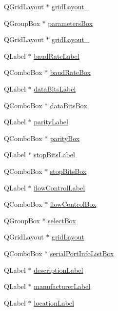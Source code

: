 \begin{DoxyCompactItemize}
\item 
Q\+Grid\+Layout $\ast$ \hyperlink{a00029_a2cc53955b73f22f0cfcf508da4654b16}{grid\+Layout\+\_}
\item 
Q\+Group\+Box $\ast$ \hyperlink{a00029_a47cebbe70a990bd1f309250101022889}{parameters\+Box}
\item 
Q\+Grid\+Layout $\ast$ \hyperlink{a00029_a7b71d6038a34f600625f007630c5234e}{grid\+Layout\+\_}
\item 
Q\+Label $\ast$ \hyperlink{a00029_a57e59712bae4f482b1ff1d61c81471e8}{baud\+Rate\+Label}
\item 
Q\+Combo\+Box $\ast$ \hyperlink{a00029_a766a61db4a8c72219543f7c096ae5601}{baud\+Rate\+Box}
\item 
Q\+Label $\ast$ \hyperlink{a00029_a4d827d5f217aa166e228b0e2c9c5aaf7}{data\+Bits\+Label}
\item 
Q\+Combo\+Box $\ast$ \hyperlink{a00029_ab6082bb196e22af4ca04a04db3402166}{data\+Bits\+Box}
\item 
Q\+Label $\ast$ \hyperlink{a00029_ae062846ca8db471d7eb362ae39123422}{parity\+Label}
\item 
Q\+Combo\+Box $\ast$ \hyperlink{a00029_a88c0b5d1f96a308ab115937b090f7bba}{parity\+Box}
\item 
Q\+Label $\ast$ \hyperlink{a00029_a665748b39dda24475690e2363b72e265}{stop\+Bits\+Label}
\item 
Q\+Combo\+Box $\ast$ \hyperlink{a00029_ad61890c5fd0acc9e72385efd02df90c0}{stop\+Bits\+Box}
\item 
Q\+Label $\ast$ \hyperlink{a00029_a7876a6baf43bd21d3b816f6a5a24fffc}{flow\+Control\+Label}
\item 
Q\+Combo\+Box $\ast$ \hyperlink{a00029_a1ebdf5da704108eae1078cefc446fbef}{flow\+Control\+Box}
\item 
Q\+Group\+Box $\ast$ \hyperlink{a00029_aea3871481f7ecb94f1835e519631f9a2}{select\+Box}
\item 
Q\+Grid\+Layout $\ast$ \hyperlink{a00029_a07d152c7cc63e2cffdda613baea54c0f}{grid\+Layout}
\item 
Q\+Combo\+Box $\ast$ \hyperlink{a00029_a323eca0d6d4b94d2d41c7737fe8b2282}{serial\+Port\+Info\+List\+Box}
\item 
Q\+Label $\ast$ \hyperlink{a00029_aaf2756662f744e79aa3443f1e035870d}{description\+Label}
\item 
Q\+Label $\ast$ \hyperlink{a00029_afeadc7657c9eaa3103bd529342f5fe97}{manufacturer\+Label}
\item 
Q\+Label $\ast$ \hyperlink{a00029_ad860892f11a79cb726643d3478078fcd}{location\+Label}

\end{DoxyCompactItemize}
